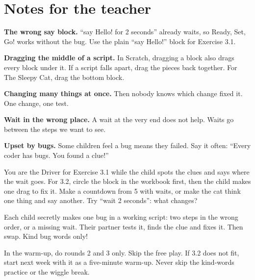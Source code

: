 \section{Notes for the teacher}
\begin{commonmistakes}
  \item \textbf{The wrong say block.} \enquote{say Hello! for 2 seconds} already waits, so Ready, Set, Go! works without the bug. Use the plain \enquote{say Hello!} block for Exercise 3.1.
  \item \textbf{Dragging the middle of a script.} In Scratch, dragging a block also drags every block under it. If a script falls apart, drag the pieces back together. For The Sleepy Cat, drag the bottom block.
  \item \textbf{Changing many things at once.} Then nobody knows which change fixed it. One change, one test.
  \item \textbf{Wait in the wrong place.} A wait at the very end does not help. Waits go between the steps we want to see.
  \item \textbf{Upset by bugs.} Some children feel a bug means they failed. Say it often: \enquote{Every coder has bugs. You found a clue!}
\end{commonmistakes}

\begin{differentiation}
\supportpath You are the Driver for Exercise 3.1 while the child spots the clues and says where the wait goes. For 3.2, circle the block in the workbook first, then the child makes one drag to fix it.
\extensionpath Make a countdown from 5 with waits, or make the cat think one thing and say another. Try \enquote{wait 2 seconds}: what changes?
\end{differentiation}

\begin{stretchchallenge}
Each child secretly makes one bug in a working script: two steps in the wrong order, or a missing wait. Their partner tests it, finds the clue and fixes it. Then swap. Kind bug words only!
\end{stretchchallenge}

\begin{teachernote}
In the warm-up, do rounds 2 and 3 only. Skip the free play. If 3.2 does not fit, start next week with it as a five-minute warm-up. Never skip the kind-words practice or the wiggle break.
\end{teachernote}
